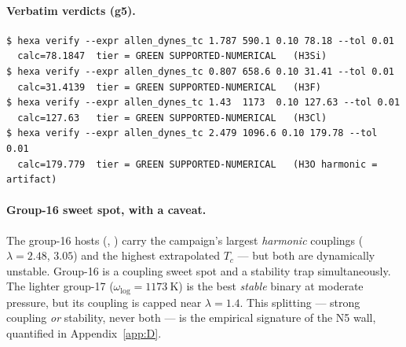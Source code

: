 \paragraph{Verbatim verdicts (g5).}
\begin{lstlisting}[basicstyle=\ttfamily\footnotesize,frame=single,xleftmargin=0pt]
$ hexa verify --expr allen_dynes_tc 1.787 590.1 0.10 78.18 --tol 0.01
  calc=78.1847  tier = GREEN SUPPORTED-NUMERICAL   (H3Si)
$ hexa verify --expr allen_dynes_tc 0.807 658.6 0.10 31.41 --tol 0.01
  calc=31.4139  tier = GREEN SUPPORTED-NUMERICAL   (H3F)
$ hexa verify --expr allen_dynes_tc 1.43  1173  0.10 127.63 --tol 0.01
  calc=127.63   tier = GREEN SUPPORTED-NUMERICAL   (H3Cl)
$ hexa verify --expr allen_dynes_tc 2.479 1096.6 0.10 179.78 --tol 0.01
  calc=179.779  tier = GREEN SUPPORTED-NUMERICAL   (H3O harmonic = artifact)
\end{lstlisting}

\paragraph{Group-16 sweet spot, with a caveat.}
The group-16 hosts (, ) carry the campaign's largest
\emph{harmonic} couplings ($\lambda = 2.48$, $3.05$) and the highest extrapolated
$T_c$ --- but both are dynamically unstable. Group-16 is a coupling sweet
spot and a stability trap simultaneously. The lighter group-17 
($\omega_{\log} = \SI{1173}{\kelvin}$) is the best \emph{stable} binary at
moderate pressure, but its coupling is capped near $\lambda = 1.4$. This
splitting --- strong coupling \emph{or} stability, never both --- is the
empirical signature of the N5 wall, quantified in Appendix~\ref{app:D}.
